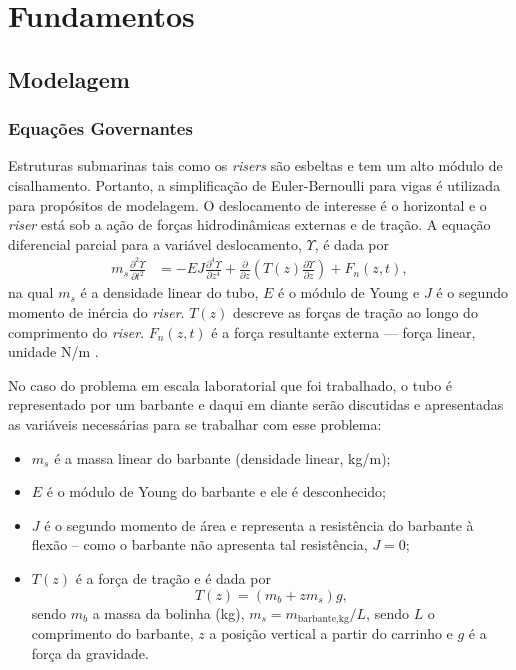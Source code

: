 \chapter{Fundamentos\label{chap:FundamentacaoMatematica}}


\section{Modelagem\label{modelagem}}
\subsection{Equações Governantes}

Estruturas submarinas tais como os \textit{risers} são esbeltas e tem um alto módulo de cisalhamento. Portanto, a simplificação de Euler-Bernoulli para vigas é utilizada para propósitos de modelagem. O deslocamento de interesse é o horizontal e o \textit{riser} está sob a ação de forças hidrodinâmicas externas e de tração. A equação diferencial parcial para a variável deslocamento, $\Upsilon$, é dada por \begin{align}
	m_s \frac{\partial^2 \Upsilon}{\partial t^2} &= -E J	\frac{\partial^4 \Upsilon}{\partial z^4} + \frac{\partial}{\partial z}\left(T(z) \frac{\partial \Upsilon}{\partial z}\right) + F_n(z,t)\label{equacaoMorison},
\end{align} na qual $m_s$ é a densidade linear do tubo, $E$ é o módulo de Young e $J$ é o segundo momento de inércia do \textit{riser}. $T(z)$ descreve as forças de tração ao longo do comprimento do \textit{riser}. $F_n(z,t)$ é a força resultante externa --- força linear, unidade N/m \cite{fabricioIFAC}. 

No caso do problema em escala laboratorial que foi trabalhado, o tubo é representado por um barbante e daqui em diante serão discutidas e apresentadas as variáveis necessárias para se trabalhar com esse problema: \begin{itemize}
	\item $m_s$ é a massa linear do barbante (densidade linear, kg/m);
	\item $E$ é o módulo de Young do barbante e ele é desconhecido;
	\item $J$ é o segundo momento de área e representa a resistência do barbante à flexão -- como o barbante não apresenta tal resistência, $J=0$;
	\item $T(z)$ é a força de tração e é dada por \[T(z) = \left(m_b+z m_s\right)g,\] sendo $m_b$ a massa da bolinha (kg), $m_s = m_{\textrm{barbante,kg}}/L$, sendo $L$ o comprimento do barbante, $z$ a posição vertical a partir do carrinho e $g$ é a força da gravidade.
\end{itemize}


